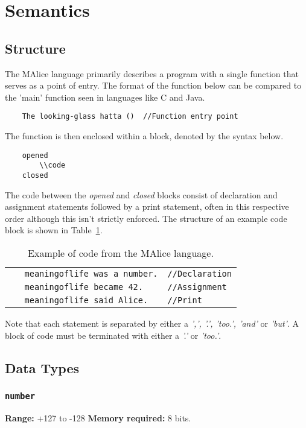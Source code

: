 \documentclass[a4wide, 10pt]{article}
\begin{document}
\section{Semantics}
\subsection{Structure}
The MAlice language primarily describes a program with a single function 
that serves as a point of entry. The format of the function below can be
compared to the 'main' function seen in languages like C and Java.

\begin{verbatim}
    The looking-glass hatta ()  //Function entry point
\end{verbatim}

The function is then enclosed within a block, denoted by the syntax below.
\begin{verbatim}
    opened
        \\code
    closed
\end{verbatim}

The code between the \emph{opened} and \emph{closed} blocks consist of 
declaration and assignment statements followed by a print statement, 
often in this respective order although this isn't strictly enforced. The 
structure of an example code block is shown in Table~\ref{tab:code}.

\begin{table}[h]
\begin{tabular}{l l}
\verb|   meaningoflife was a number.| & \verb|//Declaration| \\
\verb|   meaningoflife became 42.| & \verb|//Assignment| \\
\verb|   meaningoflife said Alice.| & \verb|//Print| \\
\end{tabular}
\caption{Example of code from the MAlice language.}
\label{tab:code}
\end{table}
  
Note that each statement is separated by either a \emph{',', '.', 'too.',
 'and'} or \emph{'but'}. A block of code must be terminated with either a 
 \emph{'.'} or \emph{'too.'}.

\subsection{Data Types}

\subsubsection{\texttt{number}}
\label{sec:number}
{\bf Range:} +127 to -128 {\bf Memory required:} 8 bits.
 
\end{document}
